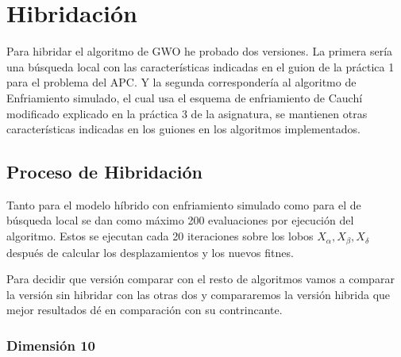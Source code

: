 \documentclass[a4paper]{report}
\begin{document}
\section{Hibridación }

Para hibridar el algoritmo de GWO he probado dos versiones. La primera sería una búsqueda local con las características indicadas en el guion de la práctica 1 para el problema del APC. Y la segunda correspondería al algoritmo de Enfriamiento simulado, el cual usa el esquema de enfriamiento de Cauchí modificado explicado en la práctica 3 de la asignatura, se mantienen otras características indicadas en los guiones en los algoritmos implementados.



\subsection{Proceso de Hibridación}

Tanto para el modelo híbrido con enfriamiento simulado como para el de búsqueda local se dan como máximo 200 evaluaciones por ejecución del algoritmo. Estos se ejecutan cada 20 iteraciones sobre los lobos $X_\alpha,X_\beta,X_\delta$ después de calcular los desplazamientos y los nuevos fitnes.

Para decidir que versión comparar con el resto de algoritmos vamos a comparar la versión sin hibridar con las otras dos y compararemos la versión hibrida que mejor resultados dé en comparación con su contrincante.


\subsubsection*{Dimensión 10}
\end{document}
